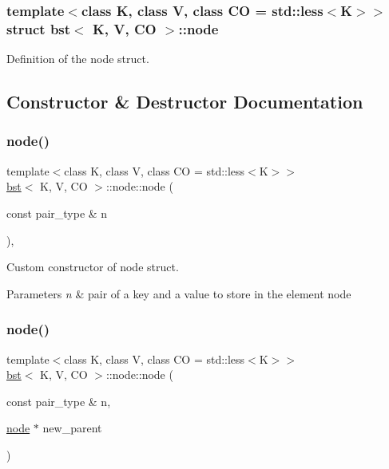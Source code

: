 \subsubsection*{template$<$class K, class V, class CO = std\+::less$<$\+K$>$$>$\newline
struct bst$<$ K, V, C\+O $>$\+::node}

Definition of the node struct. 

\subsection{Constructor \& Destructor Documentation}
\mbox{\label{structbst_1_1node_a02192633338afde3104d8036748dcbe9}} 
\subsubsection{\texorpdfstring{node()}{node()}\hspace{0.1cm}{\footnotesize\ttfamily [1/5]}}
{\footnotesize\ttfamily template$<$class K, class V, class CO = std\+::less$<$\+K$>$$>$ \\
\hyperlink{classbst}{bst}$<$ K, V, CO $>$\+::node\+::node (\begin{DoxyParamCaption}\item[{const pair\+\_\+type \&}]{n }\end{DoxyParamCaption})\hspace{0.3cm}{\ttfamily [inline]}, {\ttfamily [explicit]}}



Custom constructor of node struct. 


\begin{DoxyParams}{Parameters}
{\em n} & pair of a key and a value to store in the element node \\
\hline
\end{DoxyParams}
\mbox{\label{structbst_1_1node_abd29bdf9f83aedca2dd04264d61624d4}} 
\subsubsection{\texorpdfstring{node()}{node()}\hspace{0.1cm}{\footnotesize\ttfamily [2/5]}}
{\footnotesize\ttfamily template$<$class K, class V, class CO = std\+::less$<$\+K$>$$>$ \\
\hyperlink{classbst}{bst}$<$ K, V, CO $>$\+::node\+::node (\begin{DoxyParamCaption}\item[{const pair\+\_\+type \&}]{n,  }\item[{\hyperlink{structbst_1_1node}{node} $\ast$}]{new\+\_\+parent }\end{DoxyParamCaption})\hspace{0.3cm}{\ttfamily [inline]}}



